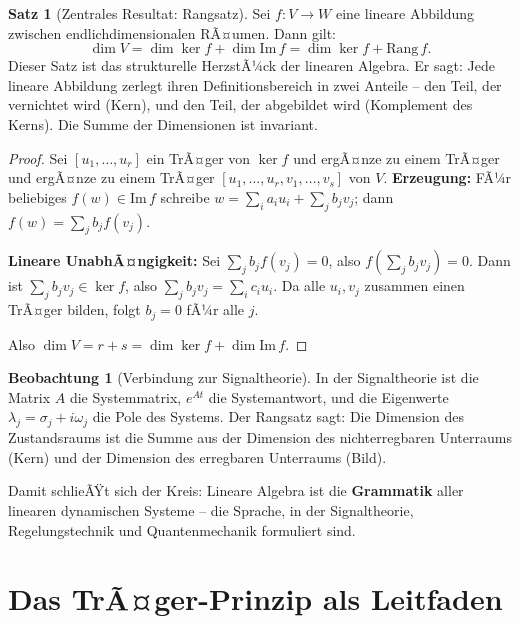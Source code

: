 ﻿\documentclass[a4paper,12pt]{report}
\theoremstyle{definition}
\newtheorem{satz}{Satz}
\newtheorem{beobachtung}{Beobachtung}
\begin{document}
\begin{satz}[Zentrales Resultat: Rangsatz]
    Sei $f : V \to W$ eine lineare Abbildung zwischen endlichdimensionalen
    RÃ¤umen. Dann gilt:
    \[
        \dim V = \dim \ker f + \dim \mathrm{Im}\, f = \dim \ker f + \mathrm{Rang}\, f.
    \]
    Dieser Satz ist das strukturelle HerzstÃ¼ck der linearen Algebra. Er
    sagt: Jede lineare Abbildung zerlegt ihren Definitionsbereich in zwei
    Anteile -- den Teil, der vernichtet wird (Kern), und den Teil, der
    abgebildet wird (Komplement des Kerns). Die Summe der Dimensionen
    ist invariant.
\end{satz}
\begin{proof}
    Sei $[u_1, \ldots, u_r]$ ein TrÃ¤ger von $\ker f$
    und ergÃ¤nze zu einem TrÃ¤ger
    und ergÃ¤nze zu einem TrÃ¤ger $[u_1, \ldots, u_r,
    v_1, \ldots, v_s]$ von $V$.
    \textbf{Erzeugung:} FÃ¼r beliebiges $f(w) \in \mathrm{Im}\, f$ schreibe
    $w = \sum_i a_i u_i + \sum_j b_j v_j$; dann $f(w) = \sum_j b_j f(v_j)$.

    \textbf{Lineare UnabhÃ¤ngigkeit:} Sei $\sum_j b_j f(v_j) = 0$, also
    $f(\sum_j b_j v_j) = 0$. Dann ist $\sum_j b_j v_j \in \ker f$,
    also $\sum_j b_j v_j = \sum_i c_i u_i$. Da alle $u_i, v_j$ zusammen
    einen TrÃ¤ger bilden, folgt $b_j = 0$ fÃ¼r alle $j$.

    Also $\dim V = r + s = \dim \ker f + \dim \mathrm{Im}\, f$.
\end{proof}


\begin{beobachtung}[Verbindung zur Signaltheorie]
    In der Signaltheorie ist die Matrix $A$ die Systemmatrix, $e^{At}$
    die Systemantwort, und die Eigenwerte $\lambda_j = \sigma_j + i\omega_j$
    die Pole des Systems. Der Rangsatz sagt: Die Dimension des Zustandsraums
    ist die Summe aus der Dimension des nichterregbaren Unterraums (Kern) und
    der Dimension des erregbaren Unterraums (Bild).

    Damit schlieÃŸt sich der Kreis: Lineare Algebra ist die
    \textbf{Grammatik} aller linearen dynamischen Systeme -- die Sprache,
    in der Signaltheorie, Regelungstechnik und Quantenmechanik formuliert sind.
\end{beobachtung}



\section{Das TrÃ¤ger-Prinzip als Leitfaden}
\end{document}
